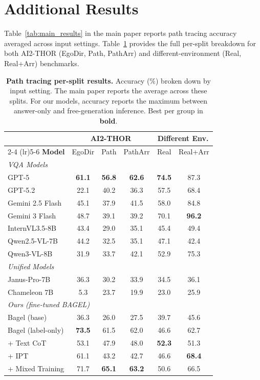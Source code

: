 \section{Additional Results}
\label{supp_additional_results}

Table~\ref{tab:main_results} in the main paper reports path tracing accuracy averaged across input settings.
Table~\ref{tab:pt_breakdown} provides the full per-split breakdown for both AI2-THOR (EgoDir, Path, PathArr) and different-environment (Real, Real+Arr) benchmarks.

\begin{table}[]
  \caption{\textbf{Path tracing per-split results.} Accuracy (\%) broken down by input setting. The main paper reports the average across these splits. For our models, accuracy reports the maximum between answer-only and free-generation inference. Best per group in \textbf{bold}.}
  \centering
  \small
  \begin{tabular}{l ccc cc}
    \toprule
    & \multicolumn{3}{c}{\textbf{AI2-THOR}} & \multicolumn{2}{c}{\textbf{Different Env.}} \\
    \cmidrule(lr){2-4} \cmidrule(lr){5-6}
    \textbf{Model}
      & EgoDir & Path & PathArr
      & Real & Real+Arr \\
    \midrule
    \multicolumn{6}{l}{\emph{VQA Models}} \\
    GPT-5            & \textbf{61.1} & \textbf{56.8} & \textbf{62.6} & \textbf{74.5} & 87.3 \\
    GPT-5.2          & 22.1 & 40.2 & 36.3 & 57.5 & 68.4 \\
    Gemini 2.5 Flash & 45.1 & 37.9 & 41.5 & 58.0 & 84.8 \\
    Gemini 3 Flash   & 48.7 & 39.1 & 39.2 & 70.1 & \textbf{96.2} \\
    InternVL3.5-8B   & 43.4 & 29.0 & 35.1 & 45.4 & 49.4 \\
    Qwen2.5-VL-7B   & 44.2 & 32.5 & 35.1 & 47.1 & 42.4 \\
    Qwen3-VL-8B     & 31.9 & 33.7 & 42.1 & 52.9 & 75.3 \\
    \midrule
    \multicolumn{6}{l}{\emph{Unified Models}} \\
    Janus-Pro-7B     & 36.3 & 30.2 & 33.9 & 34.5 & 36.1 \\
    Chameleon 7B     & 5.3 & 23.7 & 19.9 & 23.0 & 25.9 \\
    \midrule
    \multicolumn{6}{l}{\emph{Ours (fine-tuned BAGEL)}} \\
    Bagel (base)              & 36.3 & 26.0 & 27.5 & 39.7 & 45.6 \\
    Bagel (label-only)        & \textbf{73.5} & 61.5 & 62.0 & 46.6 & 62.7 \\
    + Text CoT                 & 53.1 & 47.9 & 48.0 & \textbf{52.3} & 51.3 \\
    + IPT                       & 61.1 & 43.2 & 42.7 & 46.6 & \textbf{68.4} \\
    + Mixed Training            & 71.7 & \textbf{65.1} & \textbf{63.2} & 50.6 & 66.5 \\
    \bottomrule
  \end{tabular}
  \label{tab:pt_breakdown}
\end{table}


